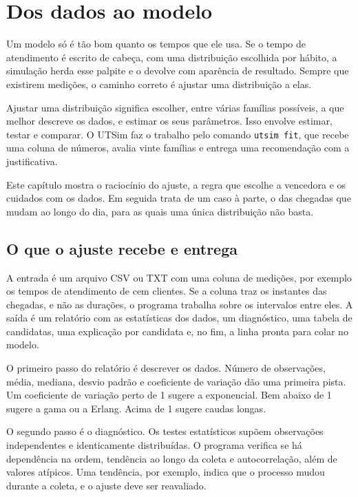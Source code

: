 \chapter{Dos dados ao modelo}
\label{cap-dados}


Um modelo só é tão bom quanto os tempos que ele usa. Se o tempo de atendimento é escrito de cabeça, com uma distribuição escolhida por hábito, a simulação herda esse palpite e o devolve com aparência de resultado. Sempre que existirem medições, o caminho correto é ajustar uma distribuição a elas.

Ajustar uma distribuição significa escolher, entre várias famílias possíveis, a que melhor descreve os dados, e estimar os seus parâmetros. Isso envolve estimar, testar e comparar. O UTSim faz o trabalho pelo comando \texttt{utsim fit}, que recebe uma coluna de números, avalia vinte famílias e entrega uma recomendação com a justificativa.

Este capítulo mostra o raciocínio do ajuste, a regra que escolhe a vencedora e os cuidados com os dados. Em seguida trata de um caso à parte, o das chegadas que mudam ao longo do dia, para as quais uma única distribuição não basta.

\section{O que o ajuste recebe e entrega}

A entrada é um arquivo CSV ou TXT com uma coluna de medições, por exemplo os tempos de atendimento de cem clientes. Se a coluna traz os instantes das chegadas, e não as durações, o programa trabalha sobre os intervalos entre eles. A saída é um relatório com as estatísticas dos dados, um diagnóstico, uma tabela de candidatas, uma explicação por candidata e, no fim, a linha pronta para colar no modelo.

O primeiro passo do relatório é descrever os dados. Número de observações, média, mediana, desvio padrão e coeficiente de variação dão uma primeira pista. Um coeficiente de variação perto de 1 sugere a exponencial. Bem abaixo de 1 sugere a gama ou a Erlang. Acima de 1 sugere caudas longas.

O segundo passo é o diagnóstico. Os testes estatísticos supõem observações independentes e identicamente distribuídas. O programa verifica se há dependência na ordem, tendência ao longo da coleta e autocorrelação, além de valores atípicos. Uma tendência, por exemplo, indica que o processo mudou durante a coleta, e o ajuste deve ser reavaliado.

